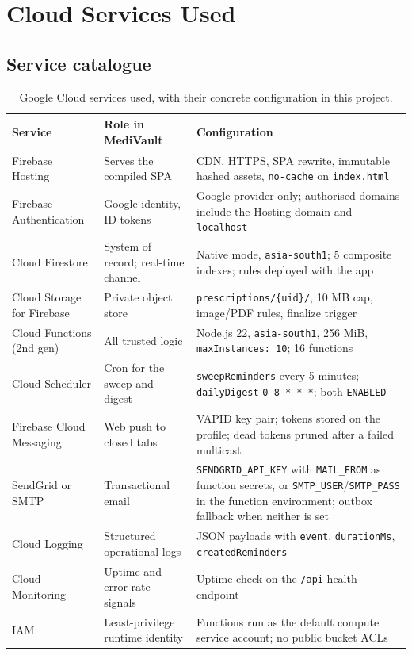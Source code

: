 \documentclass[11pt,a4paper]{report}
\begin{document}
\chapter{Cloud Services Used}

\section{Service catalogue}

\begin{table}[h]
\centering
\caption{Google Cloud services used, with their concrete configuration in this project.}
\label{tab:services}
\small
\begin{tabularx}{\textwidth}{@{}>{\raggedright\arraybackslash}p{3.1cm} X X@{}}
\toprule
\textbf{Service} & \textbf{Role in MediVault} & \textbf{Configuration} \\
\midrule
Firebase Hosting & Serves the compiled SPA & CDN, HTTPS, SPA rewrite, immutable hashed assets, \texttt{no-cache} on \texttt{index.html} \\
Firebase Authentication & Google identity, ID tokens & Google provider only; authorised domains include the Hosting domain and \texttt{localhost} \\
Cloud Firestore & System of record; real-time channel & Native mode, \texttt{asia-south1}; 5 composite indexes; rules deployed with the app \\
Cloud Storage for Firebase & Private object store & \texttt{prescriptions/\{uid\}/}, 10 MB cap, image/PDF rules, finalize trigger \\
Cloud Functions (2nd gen) & All trusted logic & Node.js 22, \texttt{asia-south1}, 256 MiB, \texttt{maxInstances: 10}; 16 functions \\
Cloud Scheduler & Cron for the sweep and digest & \texttt{sweepReminders} every 5 minutes; \texttt{dailyDigest} \texttt{0 8 * * *}; both \texttt{ENABLED} \\
Firebase Cloud Messaging & Web push to closed tabs & VAPID key pair; tokens stored on the profile; dead tokens pruned after a failed multicast \\
SendGrid or SMTP & Transactional email & \texttt{SENDGRID\_API\_KEY} with \texttt{MAIL\_FROM} as function secrets, or \texttt{SMTP\_USER}/\texttt{SMTP\_PASS} in the function environment; outbox fallback when neither is set \\
Cloud Logging & Structured operational logs & JSON payloads with \texttt{event}, \texttt{durationMs}, \texttt{createdReminders} \\
Cloud Monitoring & Uptime and error-rate signals & Uptime check on the \texttt{/api} health endpoint \\
IAM & Least-privilege runtime identity & Functions run as the default compute service account; no public bucket ACLs \\
\bottomrule
\end{tabularx}
\end{table}
\end{document}
